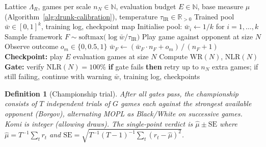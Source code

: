 \documentclass[11pt,a4paper]{article}
\newtheorem{definition}[theorem]{Definition}
\newcommand{\softmax}{\mathrm{softmax}}
\begin{document}
\begin{algorithm}[ht]
\caption{Queen's Gated Training (Phase~1)
  \textup{[Replicator Flow on Expanding Lattice]}}\label{alg:queen}
\begin{algorithmic}[1]
\Require Lattice $\Lambda_R$, games per scale $n_N \in \mathbb{N}$,
  evaluation budget $E \in \mathbb{N}$, base measure $\mu$
  (Algorithm~\ref{alg:drunk-calibration}),
  temperature $\tau_{\mathrm{IR}} \in \mathbb{R}_{>0}$
\Ensure Trained pool $\bar{w} \in [0,1]^k$, training log, checkpoint map
\State Initialise pool: $\bar{w}_i \gets 1/k$ for
  $i = 1, \ldots, k$ 
    \State Sample framework
      $F \sim \softmax\!\bigl(\log \bar{w} / \tau_{\mathrm{IR}}\bigr)$
    \State Play game against opponent at size $N$
    \State Observe outcome $o_m \in \{0, 0.5, 1\}$
    \State $\bar{w}_F \gets
      (\bar{w}_F \cdot n_F + o_m)\, / \,(n_F + 1)$
  \EndFor
  \State \textbf{Checkpoint:} play $E$ evaluation games at size $N$
  \State Compute $\mathrm{WR}(N)$, $\mathrm{NLR}(N)$
  \State \textbf{Gate:} verify $\mathrm{NLR}(N) = 100\%$
  \State \textbf{if} gate fails \textbf{then} retry up to $n_N$ extra games;
    if still failing, continue with warning
\EndFor
\State \Return $\bar{w}$, training log, checkpoints
\end{algorithmic}
\end{algorithm}

\begin{definition}[Championship trial]\label{def:championship}
After all gates pass, the championship consists of
$T$ independent trials of $G$ games each against
the strongest available opponent (Borgov), alternating
MOPL as Black/White on successive games.
Komi is integer (allowing draws).
The single-point verdict is
$\hat{\mu} \pm \mathrm{SE}$
where $\hat{\mu} = T^{-1}\sum_t r_t$ and
$\mathrm{SE} = \sqrt{T^{-1}(T-1)^{-1}\sum_t (r_t - \hat\mu)^2}$.
\end{definition}
\end{document}
